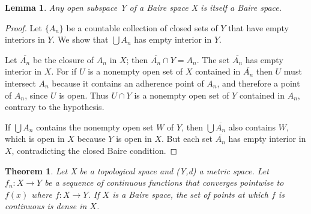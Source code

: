 \documentclass[12pt]{article}
\newtheorem{theorem}{Theorem}
\newcommand{\bet}{\begin{theorem}}
\newcommand{\et}{\end{theorem}}
\newtheorem{lemma}{Lemma}
\newcommand{\bel}{\begin{lemma}}
\newcommand{\el}{\end{lemma}}
\begin{document}
\bel Any open subspace Y of a Baire space X is itself a Baire space. 
\el
\begin{proof}
	Let $\{A_n\}$ be a countable collection of closed sets of $Y$ that have empty interiors in $Y$. We show that $\bigcup A_n$ has empty interior in $Y$. \par
	Let $\overline{A_n}$ be the closure of $A_n$ in $X$; then $\overline{A_n}\cap Y=A_n$. The set $\overline{A_n}$ has empty interior in $X$. For if $U$ is a nonempty open set of $X$ contained in $\overline{A_n}$ then $U$ must intersect $A_n$ because it contains an adherence point of $A_n$, and therefore a point of $A_n$, since $U$ is open. Thus $U\cap Y$ is a nonempty open set of $Y$ contained in $A_n$, contrary to the hypothesis.
\par
	 If $\bigcup A_n$ contains the nonempty open set $W$ of $Y$, then $\bigcup \overline{A_n}$ also contains $W$, which is open in $X$ because $Y$ is open in $X$. But each set $\overline{A_n}$ has empty interior in $X$, contradicting the closed Baire condition.  
\end{proof}
\bet Let X be a topological space and (Y,d) a metric space. Let $f_n:X\rightarrow Y$ be a sequence of continuous functions that converges pointwise to $f(x)$ where $f:X\rightarrow Y$. If $X$ is a Baire space, the set of points at which $f$ is continuous is dense in $X$.  
\et
\end{document}
